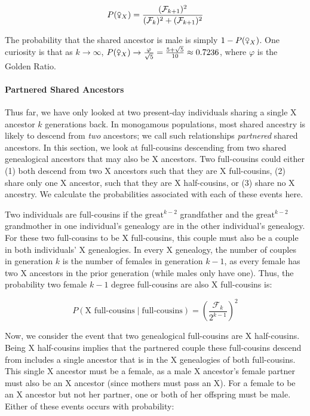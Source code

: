 \documentclass[9pt,twocolumn,twoside]{gsajnl}
\newcommand{\fsxa}{\venus_X}
\begin{document}
\begin{equation}
  P(\fsxa) = \frac{(\mathcal{F}_{k+1})^2}{(\mathcal{F}_k)^2 + (\mathcal{F}_{k+1})^2}
\end{equation}

The probability that the shared ancestor is male is simply $1-P(\fsxa)$. One
curiosity is that as $k \to \infty$, $P(\fsxa) \to \frac{\varphi}{\sqrt{5}} =
\frac{5 + \sqrt{5}}{10} \approx 0.7236$, where $\varphi$ is the Golden Ratio.

\paragraph{Partnered Shared Ancestors}

Thus far, we have only looked at two present-day individuals sharing a single X
ancestor $k$ generations back. In monogamous populations, most shared ancestry
is likely to descend from \emph{two} ancestors; we call such relationships
\emph{partnered} shared ancestors. In this section, we look at full-cousins
descending from two shared genealogical ancestors that may also be X ancestors.
Two full-cousins could either (1) both descend from two X ancestors such that
they are X full-cousins, (2) share only one X ancestor, such that they are X
half-cousins, or (3) share no X ancestry. We calculate the probabilities
associated with each of these events here.

Two individuals are full-cousins if the $\text{great}^{k-2}$ grandfather and
the $\text{great}^{k-2}$ grandmother in one individual's genealogy are in the
other individual's genealogy. For these two full-cousins to be X full-cousins,
this couple must also be a couple in both individuals' X genealogies. In every
X genealogy, the number of couples in generation $k$ is the number of females
in generation $k-1$, as every female has two X ancestors in the prior
generation (while males only have one). Thus, the probability two female $k-1$
degree full-cousins are also X full-cousins is:

\begin{equation}
  P(\text{X full-cousins} \; | \; \text{full-cousins}) = 
    \left( \frac{\mathcal{F}_k}{2^{k-1}} \right)^2
\end{equation}


Now, we consider the event that two genealogical full-cousins are X
half-cousins. Being X half-cousins implies that the partnered couple these
full-cousins descend from includes a single ancestor that is in the X
genealogies of both full-cousins. This single X ancestor must be a female, as a
male X ancestor's female partner must also be an X ancestor (since mothers must
pass an X). For a female to be an X ancestor but not her partner, one or both
of her offspring must be male. Either of these events occurs with probability:
\end{document}
